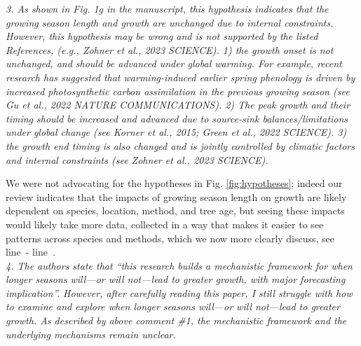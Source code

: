 \documentclass[11pt]{article}
\newcommand{\lr}[1]{line~\lineref{#1}}
\begin{document}

\emph{3. As shown in Fig. 1g in the manuscript, this hypothesis indicates that the growing season length and growth are unchanged due to internal constraints. However, this hypothesis may be wrong and is not supported by the listed References, (e.g., Zohner et al., 2023 SCIENCE). 1) the growth onset is not unchanged, and should be advanced under global warming. For example, recent research has suggested that warming-induced earlier spring phenology is driven by increased photosynthetic carbon assimilation in the previous growing season (see Gu et al., 2022 NATURE COMMUNICATIONS). 2) The peak growth and their timing should be increased and advanced due to source-sink balances/limitations under global change (see Korner et al., 2015; Green et al., 2022 SCIENCE). 3) the growth end timing is also changed and is jointly controlled by climatic factors and internal constraints (see Zohner et al., 2023 SCIENCE).}

We were not advocating for the hypotheses in Fig. \ref{fig:hypotheses}; indeed our review indicates that the impacts of growing season length on growth are likely dependent on species, location, method, and tree age, but seeing these impacts would likely take more data, collected in a way that makes it easier to see patterns across species and methods, which we now more clearly discuss, see  \lr{R2complaint3S}- \lr{R2complaint3E}.\\ %

\emph{4. The authors state that ``this research builds a mechanistic framework for when longer seasons will---or will not---lead to greater growth, with major forecasting implication''. However, after carefully reading this paper, I still struggle with how to examine and explore when longer seasons will---or will not---lead to greater growth. As described by above comment \#1, the mechanistic framework and the underlying mechanisms remain unclear.}
\end{document}
